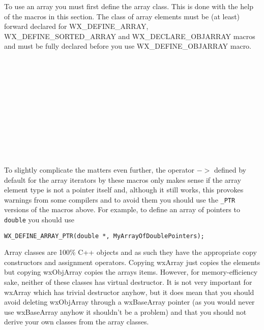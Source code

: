 

To use an array you must first define the array class. This is done with the
help of the macros in this section. The class of array elements must be (at
least) forward declared for WX\_DEFINE\_ARRAY, WX\_DEFINE\_SORTED\_ARRAY and
WX\_DECLARE\_OBJARRAY macros and must be fully declared before you use
WX\_DEFINE\_OBJARRAY macro.

\\
\\
\\
\\
\\
\\
\\
\\
\\
\\

To slightly complicate the matters even further, the operator $->$ defined by
default for the array iterators by these macros only makes sense if the array
element type is not a pointer itself and, although it still works, this
provokes warnings from some compilers and to avoid them you should use the 
{\tt \_PTR} versions of the macros above. For example, to define an array of
pointers to {\tt double} you should use

\begin{verbatim} 
WX_DEFINE_ARRAY_PTR(double *, MyArrayOfDoublePointers);
\end{verbatim}


Array classes are 100\% C++ objects and as such they have the appropriate copy
constructors and assignment operators. Copying wxArray just copies the elements
but copying wxObjArray copies the arrays items. However, for memory-efficiency
sake, neither of these classes has virtual destructor. It is not very important
for wxArray which has trivial destructor anyhow, but it does mean that you
should avoid deleting wxObjArray through a wxBaseArray pointer (as you would
never use wxBaseArray anyhow it shouldn't be a problem) and that you should not
derive your own classes from the array classes.

